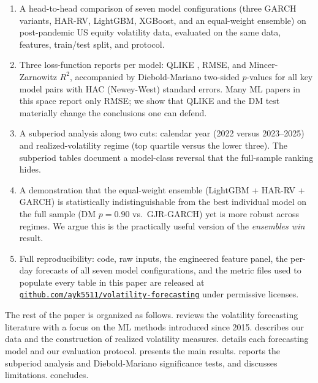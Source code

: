 \begin{enumerate}[leftmargin=*]
    \item A head-to-head comparison of seven model configurations (three GARCH variants, HAR-RV, LightGBM, XGBoost, and an equal-weight ensemble) on post-pandemic US equity volatility data, evaluated on the same data, features, train/test split, and protocol.

    \item Three loss-function reports per model: QLIKE \citep{Patton2011}, RMSE, and Mincer-Zarnowitz $R^2$, accompanied by Diebold-Mariano two-sided $p$-values for all key model pairs with HAC (Newey-West) standard errors. Many ML papers in this space report only RMSE; we show that QLIKE and the DM test materially change the conclusions one can defend.

    \item A subperiod analysis along two cuts: calendar year (2022 versus 2023--2025) and realized-volatility regime (top quartile versus the lower three). The subperiod tables document a model-class reversal that the full-sample ranking hides.

    \item A demonstration that the equal-weight ensemble (LightGBM + HAR-RV + GARCH) is statistically indistinguishable from the best individual model on the full sample (DM $p = 0.90$ vs.\ GJR-GARCH) yet is more robust across regimes. We argue this is the practically useful version of the \emph{ensembles win} result.

    \item Full reproducibility: code, raw inputs, the engineered feature panel, the per-day forecasts of all seven model configurations, and the metric files used to populate every table in this paper are released at \href{https://github.com/ayk5511/volatility-forecasting}{\nolinkurl{github.com/ayk5511/volatility-forecasting}} under permissive licenses.
\end{enumerate}

The rest of the paper is organized as follows.  reviews the volatility forecasting literature with a focus on the ML methods introduced since 2015.  describes our data and the construction of realized volatility measures.  details each forecasting model and our evaluation protocol.  presents the main results.  reports the subperiod analysis and Diebold-Mariano significance tests, and discusses limitations.  concludes.
